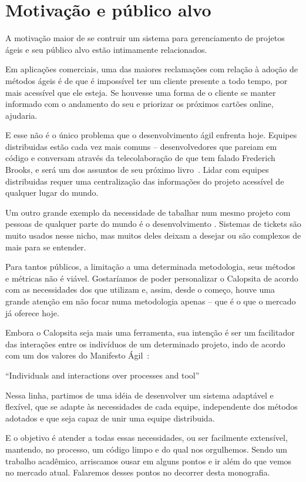 \section{Motivação e público alvo}

A motivação maior de se contruir um sistema para gerenciamento de projetos ágeis e seu público alvo estão intimamente relacionados. 

Em aplicações comerciais, uma das maiores reclamações com relação à adoção de métodos ágeis é de que é impossível ter um cliente presente a todo tempo, por mais acessível que ele esteja. Se houvesse uma forma de o cliente se manter informado com o andamento do seu \software e priorizar os próximos cartões online, ajudaria.

E esse não é o único problema que o desenvolvimento ágil enfrenta hoje. Equipes distribuidas estão cada vez mais comuns -- desenvolvedores que pareiam em código e conversam através da telecolaboração de que tem falado Frederich Brooks, e será um dos assuntos de seu próximo livro~\cite{brooks}. Lidar com equipes distribuidas requer uma centralização das informações do projeto acessível de qualquer lugar do mundo.

Um outro grande exemplo da necessidade de tabalhar num mesmo projeto com pessoas de qualquer parte do mundo é o desenvolvimento \opensource. Sistemas de tickets são muito usados nesse nicho, mas muitos deles deixam a desejar ou são complexos de mais para se entender.

Para tantos públicos, a limitação a uma determinada metodologia, seus métodos e métricas não é viável. Gostaríamos de poder personalizar o Calopsita de acordo com as necessidades dos que utilizam e, assim, desde o começo, houve uma grande atenção em não focar numa metodologia apenas -- que é o que o mercado já oferece hoje.

Embora o Calopsita seja mais uma ferramenta, sua intenção é ser um facilitador das interações entre os indivíduos de um determinado projeto, indo de acordo com um dos valores do Manifesto Ágil~\cite{manifesto}:

``Individuals and interactions over processes and tool''

Nessa linha, partimos de uma idéia de desenvolver um sistema adaptável e flexível, que se adapte às necessidades de cada equipe, independente dos métodos adotados e que seja capaz de unir uma equipe distribuida.

E o objetivo é atender a todas essas necessidades, ou ser facilmente extensível, mantendo, no processo, um código limpo e do qual nos orgulhemos. Sendo um trabalho acadêmico, arriscamos ousar em alguns pontos e ir além do que vemos no mercado atual. Falaremos desses pontos no decorrer desta monografia.
